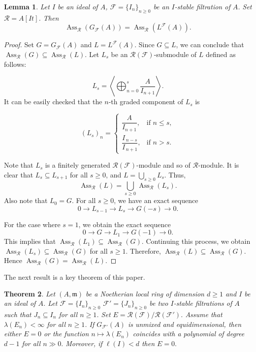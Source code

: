 \documentclass[11pt]{amsart}
\theoremstyle{plain}
\newtheorem{theorem}{Theorem}[section]
\newtheorem{lemma}[theorem]{Lemma}
\newcommand{\R}{\mathcal{R}}
\newcommand{\F}{\mathcal{F}}
\newcommand{\Ass}{\operatorname{Ass}}
\theoremstyle{plain}
\begin{document}
\begin{lemma}
\label{Thm:ASS}
    Let  $I$ be an ideal of $A$, $\F=\{I_n\}_{n\geq 0}$ be an $I$-stable filtration of $A$. Set $\R=A[It]$. Then $$\operatorname{Ass}_{\mathcal{R}}({G}_{\F}(A))=\operatorname{Ass}_{\mathcal{R}}({L}^{\F}(A)).$$
    \end{lemma}
    \begin{proof}
     Set $G={G}_{\F}(A)$ and $L={L}^{\F}(A)$.
      Since $G \subseteq L$, we can conclude that $\Ass_\R(G) \subseteq \Ass_\R(L)$.
      Let $L_s$ be an ${\R}(\F)$-submodule of $L$ defined as follows:

      $$L_s =\left \langle \bigoplus_{n=0}^{s}\dfrac{A}{{I_{n+1}}}\right \rangle.$$
It can be easily checked that the $n$-th graded component of $L_s$ is

\[
(L_s)_n =
\begin{cases}
\dfrac{A}{I_{n+1}}, & \text{if } n \leq s, \\[8pt]
\dfrac{I_{\,n-s}}{I_{\,n+1}}, & \text{if } n > s.
\end{cases}
\]

      Note that $L_s$ is a finitely generated ${\R}(\F)$-module and so of $\R$-module. It is clear that $L_s\subseteq L_{s+1}$ for all $s\geq 0$, and $L=\bigcup_{s\geq 0}L_s$. Thus, $$\operatorname{Ass}_{\R}(L)=\bigcup_{s\geq 0}\operatorname{Ass}_{\R}(L_s).$$ Also note that $L_0=G$. For all $s\geq 0$, we have an exact sequence $$0\to L_{s-1}\to L_s\to G(-s)\to 0.$$

For the case where $s=1$, we obtain the exact sequence $$0\to G\to L_1\to G(-1)\to 0.$$ This implies that $\operatorname{Ass}_{\R}(L_1)\subseteq \operatorname{Ass}_{\R}(G)$. Continuing this process, we obtain $\operatorname{Ass}_{\R}(L_s)\subseteq \operatorname{Ass}_{\R}(G)$ for all $s\geq 1.$ Therefore, $\Ass_\R (L) \subseteq \Ass_\R (G)$.
Hence $\operatorname{Ass}_{\R}(G)=\operatorname{Ass}_{\R}(L)$.
\end{proof}

 The next result is a key theorem of this paper.

\begin{theorem}\label{key}
     Let $(A,\mathfrak{m})$ be a Noetherian local ring of dimension $d\geq 1$ and $I$ be an ideal of $A$. Let $\F=\{I_n\}_{n\geq 0}$ $\F'=\{J_n\}_{n\geq 0}$ be two $I$-stable filtrations of $A$ such that $J_n\subseteq I_n$ for all $n\geq 1$. Set $E=\R(\F)/\R{(\F')}$. Assume that $\lambda(E_n)<\infty$ for all $n\geq 1$. If $G_{\F'}(A)$ is unmixed and equidimensional, then either $E=0$ or the function $n\mapsto \lambda(E_n)$ coincides with a polynomial of degree $d-1$ for all $n\gg0.$ Moreover, if $\ell(I)<d$ then $E=0.$
\end{theorem}
\end{document}

